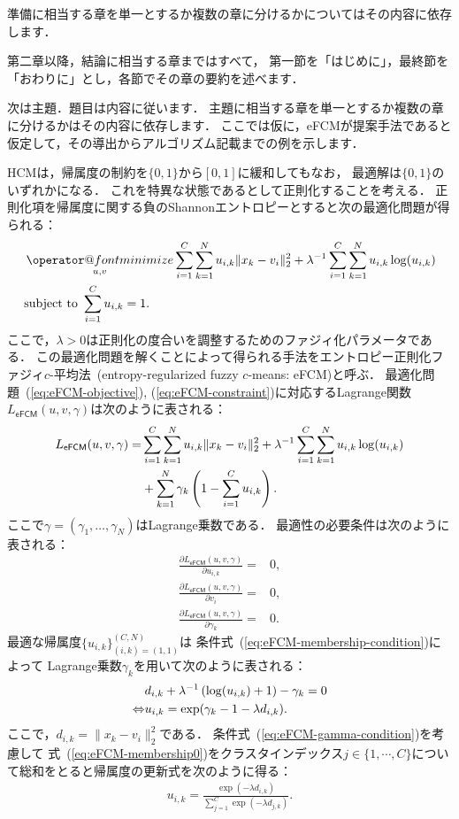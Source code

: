 \documentclass[a4j,12pt,dvipdfmx,oneside]{jsbook}
\makeatletter
\theoremstyle{definition}
\def\minimize{\mathop{\operator@font minimize}}
\makeatother
\begin{document}
準備に相当する章を単一とするか複数の章に分けるかについてはその内容に依存します．

第二章以降，結論に相当する章まではすべて，
第一節を「はじめに」，最終節を「おわりに」とし，各節でその章の要約を述べます．

次は主題．題目は内容に従います．
主題に相当する章を単一とするか複数の章に分けるかはその内容に依存します．
ここでは仮に，eFCMが提案手法であると仮定して，その導出からアルゴリズム記載までの例を示します．
\begin{breakbox}
HCMは，帰属度の制約を$\{0,1\}$から$[0,1]$に緩和してもなお，
最適解は$\{0,1\}$のいずれかになる．
これを特異な状態であるとして正則化することを考える．
正則化項を帰属度に関する負のShannonエントロピーとすると次の最適化問題が得られる：
\begin{align}
&\minimize_{u,v}\sum_{i=1}^C\sum_{k=1}^Nu_{i,k}\|x_k-v_i\|_2^2
+\lambda^{-1}\sum_{i=1}^C\sum_{k=1}^Nu_{i,k}\log(u_{i,k})
\label{eq:eFCM-objective}\\
&\text{subject to }\sum_{i=1}^Cu_{i,k}=1.
\label{eq:eFCM-constraint}
\end{align}
ここで，$\lambda>0$は正則化の度合いを調整するためのファジィ化パラメータである．
この最適化問題を解くことによって得られる手法をエントロピー正則化ファジィ$c$-平均法~(entropy-regularized fuzzy $c$-means: eFCM)と呼ぶ．
最適化問題~(\ref{eq:eFCM-objective}), (\ref{eq:eFCM-constraint})に対応するLagrange関数$L_{\mathsf{eFCM}}(u,v,\gamma)$は次のように表される：
\begin{align}
 L_{\mathsf{eFCM}}(u,v,\gamma)=& \sum_{i=1}^C \sum_{k=1}^N 
 u_{i,k} \|x_k-v_i\|_2^2
+\lambda^{-1}\sum_{i=1}^C\sum_{k=1}^Nu_{i,k}\log(u_{i,k})\notag\\
&+\sum_{k=1}^N\gamma_k\left(1-\sum_{i=1}^Cu_{i,k}\right).
\end{align}
ここで$\gamma=(\gamma_1,\dots,\gamma_N)$はLagrange乗数である．
最適性の必要条件は次のように表される：
\begin{align}
 \frac{\partial{}L_{\mathsf{eFCM}}(u,v,\gamma)}{\partial{}u_{i,k}}=&0,\label{eq:eFCM-membership-condition}\\
 \frac{\partial{}L_{\mathsf{eFCM}}(u,v,\gamma)}{\partial{}v_i}=&0,\label{eq:eFCM-centers-condition}\\
 \frac{\partial{}L_{\mathsf{eFCM}}(u,v,\gamma)}{\partial{}\gamma_k}=&0.\label{eq:eFCM-gamma-condition}
\end{align}
最適な帰属度$\{u_{i,k}\}_{(i,k)=(1,1)}^{(C,N)}$は
条件式~(\ref{eq:eFCM-membership-condition})によって
Lagrange乗数$\gamma_k$を用いて次のように表される：
\begin{align}
&d_{i,k}+\lambda^{-1}\left(\log(u_{i,k})+1\right)-\gamma_k=0\notag\\
\Leftrightarrow&u_{i,k}=\exp(\gamma_k-1-\lambda d_{i,k}).
\label{eq:eFCM-membership0}
\end{align}
ここで，$d_{i,k}=\|x_k-v_i\|_2^2$である．
条件式~(\ref{eq:eFCM-gamma-condition})を考慮して
式~(\ref{eq:eFCM-membership0})をクラスタインデックス$j\in\{1,\cdots,C\}$について総和をとると帰属度の更新式を次のように得る：
\begin{align}
u_{i,k}=\frac{
 \exp(-\lambda d_{i,k})
}{
 \sum_{j=1}^C\exp(-\lambda d_{j,k})
}.
\label{eq:eFCM-membership}
\end{align}


\end{breakbox}
\end{document}
